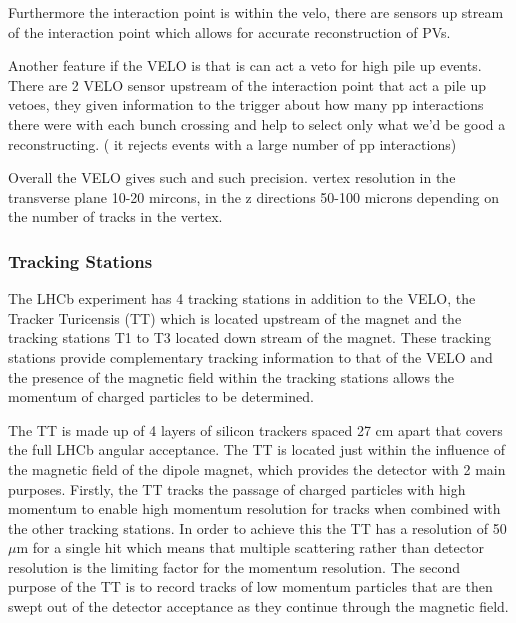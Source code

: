 Furthermore the interaction point is within the velo, there are sensors up stream of the interaction point which allows for accurate reconstruction of PVs.


Another feature if the VELO is that is can act a veto for high pile up events. There are 2 VELO sensor upstream of the interaction point that act a pile up vetoes, they given information to the trigger about how many pp interactions there were with each bunch crossing and help to select only what we’d be good a reconstructing. ( it rejects events with a large number of pp interactions)

Overall the VELO gives such and such precision.  vertex resolution in the transverse plane 10-20 mircons, in the z directions 50-100 microns depending on the number of tracks in the vertex. %



\subsubsection{Tracking Stations} 
\label{Tracking_Stations}
The LHCb experiment has 4 tracking stations in addition to the VELO, the Tracker Turicensis (TT) which is located upstream of the magnet and the tracking stations T1 to T3 located down stream of the magnet. These tracking stations provide complementary tracking information to that of the VELO and the presence of the magnetic field within the tracking stations allows the momentum of charged particles to be determined. 



The TT is made up of 4 layers of silicon trackers spaced 27 cm apart that covers the full LHCb angular acceptance. The TT is located just within the influence of the magnetic field of the dipole magnet, which provides the detector with 2 main purposes. Firstly, the TT tracks the passage of charged particles with high momentum to enable high momentum resolution for tracks when combined with the other tracking stations. In order to achieve this the TT has a resolution of 50 $\mu$m for a single hit which means that multiple scattering rather than detector resolution is the limiting factor for the momentum resolution. The second purpose of the TT is to record tracks of low momentum particles that are then swept out of the detector acceptance as they continue through the magnetic field. 


